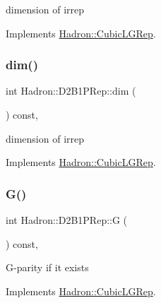 dimension of irrep 

Implements \mbox{\hyperlink{structHadron_1_1CubicLGRep_a3acbaea26503ed64f20df693a48e4cdd}{Hadron\+::\+Cubic\+L\+G\+Rep}}.

\mbox{\label{structHadron_1_1D2B1PRep_ab30c51be75c1d6ca41fa1d56c9089d2e}} 
\subsubsection{\texorpdfstring{dim()}{dim()}\hspace{0.1cm}{\footnotesize\ttfamily [2/2]}}
{\footnotesize\ttfamily int Hadron\+::\+D2\+B1\+P\+Rep\+::dim (\begin{DoxyParamCaption}{ }\end{DoxyParamCaption}) const\hspace{0.3cm}{\ttfamily [inline]}, {\ttfamily [virtual]}}

dimension of irrep 

Implements \mbox{\hyperlink{structHadron_1_1CubicLGRep_a3acbaea26503ed64f20df693a48e4cdd}{Hadron\+::\+Cubic\+L\+G\+Rep}}.

\mbox{\label{structHadron_1_1D2B1PRep_aedd87d6bd49194a47e13d78217e863c5}} 
\subsubsection{\texorpdfstring{G()}{G()}\hspace{0.1cm}{\footnotesize\ttfamily [1/2]}}
{\footnotesize\ttfamily int Hadron\+::\+D2\+B1\+P\+Rep\+::G (\begin{DoxyParamCaption}{ }\end{DoxyParamCaption}) const\hspace{0.3cm}{\ttfamily [inline]}, {\ttfamily [virtual]}}

G-\/parity if it exists 

Implements \mbox{\hyperlink{structHadron_1_1CubicLGRep_ace26f7b2d55e3a668a14cb9026da5231}{Hadron\+::\+Cubic\+L\+G\+Rep}}.

\mbox{\label{structHadron_1_1D2B1PRep_aedd87d6bd49194a47e13d78217e863c5}} 
